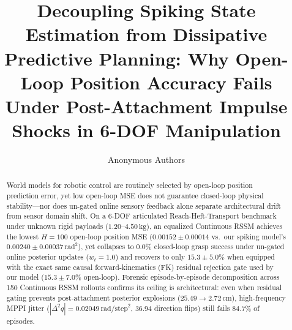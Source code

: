 \documentclass[11pt]{article}
\title{Decoupling Spiking State Estimation from Dissipative Predictive Planning: Why Open-Loop Position Accuracy Fails Under Post-Attachment Impulse Shocks in 6-DOF Manipulation}
\author{Anonymous Authors}
\date{}
\begin{document}
\maketitle

\begin{abstract}
World models for robotic control are routinely selected by open-loop position prediction error, yet low open-loop MSE does not guarantee closed-loop physical stability—nor does un-gated online sensory feedback alone separate architectural drift from sensor domain shift. On a 6-DOF articulated Reach-Heft-Transport benchmark under unknown rigid payloads ($1.20\text{--}4.50\,\text{kg}$), an equalized Continuous RSSM achieves the lowest $H=100$ open-loop position MSE ($0.00152 \pm 0.00014$ vs.\ our spiking model's $0.00240 \pm 0.00037\,\text{rad}^2$), yet collapses to $0.0\%$ closed-loop grasp success under un-gated online posterior updates ($w_t=1.0$) and recovers to only $15.3 \pm 5.0\%$ when equipped with the exact same causal forward-kinematics (FK) residual rejection gate used by our model ($15.3 \pm 7.0\%$ open-loop). Forensic episode-by-episode decomposition across 150 Continuous RSSM rollouts confirms its ceiling is architectural: even when residual gating prevents post-attachment posterior explosions ($25.49 \to 2.72\,\text{cm}$), high-frequency MPPI jitter ($|\Delta^2 q| = 0.02049\,\text{rad/step}^2$, $36.94$ direction flips) still fails $84.7\%$ of episodes.


\end{abstract}
\end{document}
